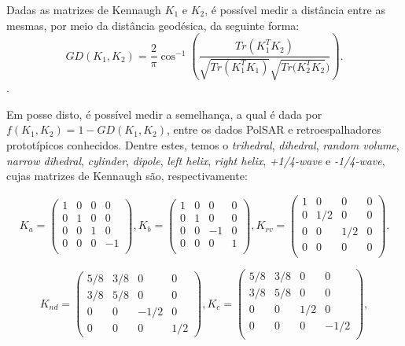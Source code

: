 \documentclass[12pt]{article}
\begin{document}
Dadas as matrizes de Kennaugh $K_1$ e $K_2$, é possível medir a distância entre as mesmas, por meio da distância geodésica, da seguinte forma:
\begin{displaymath}
GD(K_1, K_2) = \frac{2}{\pi} \cos^{-1} \left(\frac{Tr(K_1^T K_2)}{\sqrt{Tr(K_1^T K_1)} \sqrt{Tr(K_2^T K_2})} \right).
\end{displaymath}.

Em posse disto, é possível medir a semelhança, a qual é dada por $f(K_1, K_2) = 1 - GD(K_1, K_2)$, entre os dados PolSAR e retroespalhadores prototípicos conhecidos. Dentre estes, temos o \textit{trihedral}, \textit{dihedral}, \textit{random volume}, \textit{narrow dihedral}, \textit{cylinder}, \textit{dipole}, \textit{left helix}, \textit{right helix}, \textit{+1/4-wave} e \textit{-1/4-wave}, cujas matrizes de Kennaugh são, respectivamente:

\[K_a =
\begin{pmatrix}
1 & 0 & 0 & 0\\
0 & 1 & 0 & 0\\
0 & 0 & 1 & 0\\
0 & 0 & 0 & -1\\
\end{pmatrix},
K_b =
\begin{pmatrix}
1 & 0 & 0 & 0\\
0 & 1 & 0 & 0\\
0 & 0 & -1 & 0\\
0 & 0 & 0 & 1\\
\end{pmatrix},
K_{rv} =
\begin{pmatrix}
1 & 0 & 0 & 0\\
0 & 1/2 & 0 & 0\\
0 & 0 & 1/2 & 0\\
0 & 0 & 0 & 0\\
\end{pmatrix}
.\]

\[K_{nd} =
\begin{pmatrix}
5/8 & 3/8 & 0 & 0\\
3/8 & 5/8 & 0 & 0\\
0 & 0 & -1/2 & 0\\
0 & 0 & 0 & 1/2
\end{pmatrix},
K_{c} =
\begin{pmatrix}
5/8 & 3/8 & 0 & 0\\
3/8 & 5/8 & 0 & 0\\
0 & 0 & 1/2 & 0\\
0 & 0 & 0 & -1/2\\
\end{pmatrix}
,\]
\end{document}
